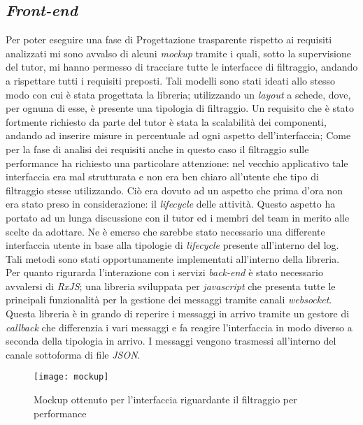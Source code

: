 \subsection{\textit{Front-end}}
Per poter eseguire una fase di Progettazione trasparente rispetto ai requisiti analizzati mi sono avvalso di alcuni \textit{\gls{mockup}} tramite i quali, sotto la supervisione del tutor, mi hanno permesso di tracciare tutte le interfacce di filtraggio, andando a rispettare tutti i requisiti preposti. Tali modelli sono stati ideati allo stesso modo con cui è stata progettata la libreria; utilizzando un \textit{layout} a schede, dove, per ognuna di esse, è presente una tipologia di filtraggio. Un requisito che è stato fortmente richiesto da parte del tutor è stata la scalabilità dei componenti, andando ad inserire misure in percentuale ad ogni aspetto dell'interfaccia; Come per la fase di analisi dei requisiti anche in questo caso il filtraggio sulle performance ha richiesto una particolare attenzione: nel vecchio applicativo tale interfaccia era mal strutturata e non era ben chiaro all'utente che tipo di filtraggio stesse utilizzando. Ciò era dovuto ad un aspetto che prima d'ora non era stato preso in considerazione: il \textit{lifecycle} delle attività. Questo aspetto ha portato ad un lunga discussione con il tutor ed i membri del team in merito alle scelte da adottare. Ne è emerso che sarebbe stato necessario una differente interfaccia utente in base alla tipologie di \textit{lifecycle} presente all'interno del log. Tali metodi sono stati opportunamente implementati all'interno della libreria.\\
Per quanto rigurarda l'interazione con i servizi \textit{back-end} è stato necessario avvalersi di \textit{RxJS}; una libreria sviluppata per \textit{javascript} che presenta tutte le principali funzionalità per la gestione dei messaggi tramite canali \textit{websocket}. Questa libreria è in grando di reperire i messaggi in arrivo tramite un gestore di \textit{callback} che differenzia i vari messaggi e fa reagire l'interfaccia in modo diverso a seconda della tipologia in arrivo. I messaggi vengono trasmessi all'interno del canale sottoforma di file \textit{\gls{JSON}}.
\begin{figure}[!h] 
	\centering 
	\texttt{[image: mockup]} 
	\caption{Mockup ottenuto per l'interfaccia riguardante il filtraggio per performance}
\end{figure}

